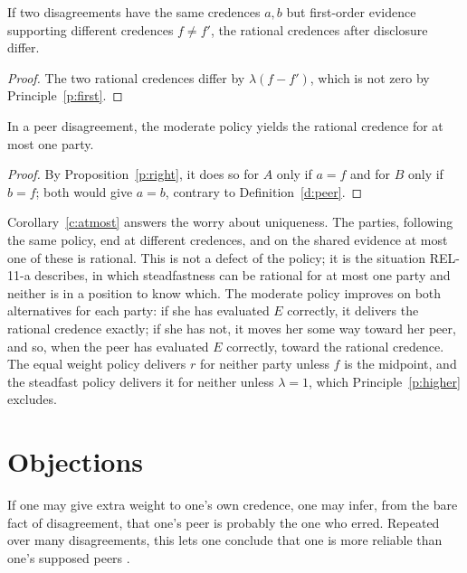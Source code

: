 \documentclass{situationist-preprint}
\begin{document}
\begin{proposition}\label{p:matters}
If two disagreements have the same credences $a, b$ but first-order evidence supporting different credences $f \neq f'$, the rational credences after disclosure differ.
\end{proposition}

\begin{proof}
The two rational credences differ by $\lambda(f - f')$, which is not zero by Principle~\ref{p:first}.
\end{proof}

\begin{corollary}\label{c:atmost}
In a peer disagreement, the moderate policy yields the rational credence for at most one party.
\end{corollary}

\begin{proof}
By Proposition~\ref{p:right}, it does so for $A$ only if $a = f$ and for $B$ only if $b = f$; both would give $a = b$, contrary to Definition~\ref{d:peer}.
\end{proof}

Corollary~\ref{c:atmost} answers the worry about uniqueness. The parties, following the same policy, end at different credences, and on the shared evidence at most one of these is rational. This is not a defect of the policy; it is the situation REL-11-a describes, in which steadfastness can be rational for at most one party and neither is in a position to know which. The moderate policy improves on both alternatives for each party: if she has evaluated $E$ correctly, it delivers the rational credence exactly; if she has not, it moves her some way toward her peer, and so, when the peer has evaluated $E$ correctly, toward the rational credence. The equal weight policy delivers $r$ for neither party unless $f$ is the midpoint, and the steadfast policy delivers it for neither unless $\lambda = 1$, which Principle~\ref{p:higher} excludes.

\section{Objections}

\begin{objection}[Bootstrapping]
If one may give extra weight to one's own credence, one may infer, from the bare fact of disagreement, that one's peer is probably the one who erred. Repeated over many disagreements, this lets one conclude that one is more reliable than one's supposed peers \citep{Elga2007}.
\end{objection}
\end{document}
